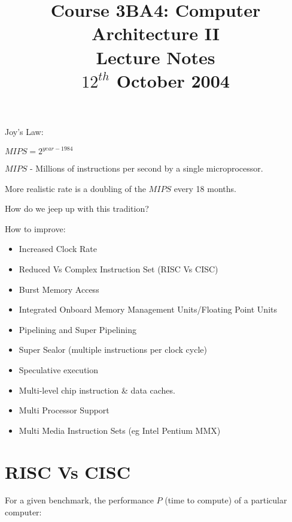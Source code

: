 \documentclass[a4paper,12pt]{article}
\begin{document}
\title{Course 3BA4: Computer Architecture II \\ Lecture Notes \\ $12^{th}$ October 2004}

\maketitle

Joy's Law:

$MIPS = 2^{year - 1984}$

$MIPS$ - Millions of instructions per second by a single microprocessor.


More realistic rate is a doubling of the $MIPS$ every 18 months.


How do we jeep up with this tradition?

How to improve:

\begin{itemize}

\item Increased Clock Rate

\item Reduced Vs Complex Instruction Set (RISC Vs CISC)

\item Burst Memory Access

\item Integrated Onboard Memory Management Units/Floating Point Units

\item Pipelining and Super Pipelining

\item Super Sealor (multiple instructions per clock cycle)

\item Speculative execution

\item Multi-level chip instruction \& data caches.

\item Multi Processor Support

\item Multi Media Instruction Sets (eg Intel Pentium MMX)

\end{itemize}

\section*{RISC Vs CISC}

For a given benchmark, the performance $P$ (time to compute) of a
particular computer:
\end{document}
